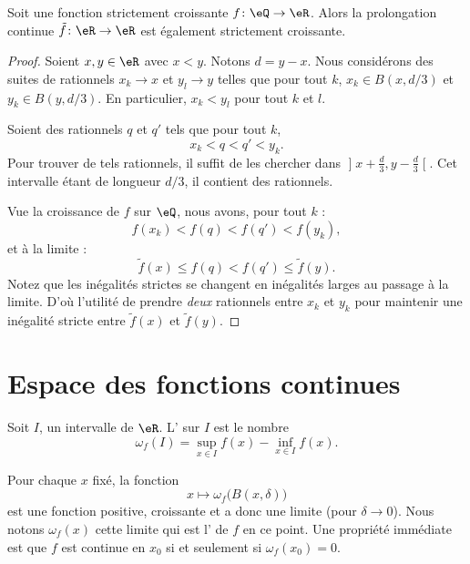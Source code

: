 \begin{proposition}      \label{PROPooTNIAooNAJDzL}
	Soit une fonction strictement croissante \( f\colon \eQ\to \eR\). Alors la prolongation continue \( \tilde f\colon \eR\to \eR\) est également strictement croissante.
\end{proposition}

\begin{proof}
	Soient \( x,y\in \eR\) avec \( x<y\). Notons \( d=y-x\). Nous considérons des suites de rationnels \( x_k\to x\) et \( y_l\to y\) telles que pour tout \( k\), \( x_k\in B(x,d/3)\) et \( y_k\in B(y,d/3)\). En particulier, \( x_k<y_l\) pour tout \( k\) et \( l\).

	Soient des rationnels \( q\) et \( q'\) tels que pour tout \( k\),
	\begin{equation}
		x_k<q<q'<y_k.
	\end{equation}
	Pour trouver de tels rationnels, il suffit de les chercher dans \( \mathopen] x+\frac{ d }{ 3 } , y-\frac{ d }{ 3 } \mathclose[\). Cet intervalle étant de longueur \( d/3\), il contient des rationnels.

	Vue la croissance de \( f\) sur \( \eQ\), nous avons, pour tout \( k\) :
	\begin{equation}
		f(x_k)<f(q)<f(q')<f(y_k),
	\end{equation}
	et à la limite :
	\begin{equation}
		\tilde f(x)\leq f(q)<f(q')\leq \tilde f(y).
	\end{equation}
	Notez que les inégalités strictes se changent en inégalités larges au passage à la limite. D'où l'utilité de prendre \emph{deux} rationnels entre \( x_k\) et \( y_k\) pour maintenir une inégalité stricte entre \(\tilde f(x)\) et \( \tilde f(y)\).
\end{proof}

\section{Espace des fonctions continues}

\begin{definition}
	Soit \( I\), un intervalle de \( \eR\). L' sur \( I\) est le nombre
	\begin{equation}
		\omega_f(I)=\sup_{x\in I}f(x)-\inf_{x\in I}f(x).
	\end{equation}
\end{definition}
Pour chaque \( x\) fixé, la fonction
\begin{equation}
	x\mapsto \omega_f\big( B(x,\delta) \big)
\end{equation}
est une fonction positive, croissante et a donc une limite (pour \( \delta\to 0\)). Nous notons \( \omega_f(x)\) cette limite qui est l' de \( f\) en ce point. Une propriété immédiate est que \( f\) est continue en \( x_0\) si et seulement si \( \omega_f(x_0)=0\).

